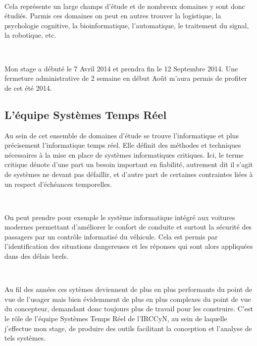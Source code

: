       ~
    
      Cela représente un large champs d'étude et de nombreux domaines y sont
      donc étudiés. Parmis ces domaines on peut en autres trouver la logistique,
      la psychologie cognitive, la bioinformatique, l'automatique, le traitement
      du signal, la robotique, etc.
        
      ~
    
      Mon stage a débuté le 7 Avril 2014 et prendra fin le 12 Septembre
      2014. Une fermeture administrative de 2 semaine en début Août m'aura
      permis de profiter de cet été 2014.

    \subsection{L'équipe Systèmes Temps Réel}

      Au sein de cet ensemble de domaines d'étude se trouve l'informatique et
      plus précisement l'informatique temps réel. Elle définit des méthodes et
      techniques nécessaires à la mise en place de systèmes informatiques
      critiques. Ici, le terme critique dénote d'une part un besoin important
      en fiabilité, autrement dit il s'agit de systèmes ne devant pas
      défaillir, et d'autre part de certaines contraintes liées à un respect
      d'échéances temporelles.

      ~
    
      On peut prendre pour exemple le système informatique intégré aux voitures
      modernes permettant d'améliorer le confort de conduite et surtout la
      sécurité des passagers par un contrôle informatisé du véhicule. Cela est
      permis par l'identification des situations dangereuses et les réponses qui
      sont alors appliquées dans des délais brefs.

      ~
    
      Au fil des années ces sytèmes deviennent de plus en plus performants du
      point de vue de l'usager mais bien évidemment de plus en plus complexes du
      point de vue du concepteur, demandant donc toujours plus de travail pour
      les construire. C'est le rôle de l'équipe Systèmes Temps Réel de l'IRCCyN,
      au sein de laquelle j'effectue mon stage, de produire des outils
      facilitant la conception et l'analyse de tels systèmes.

